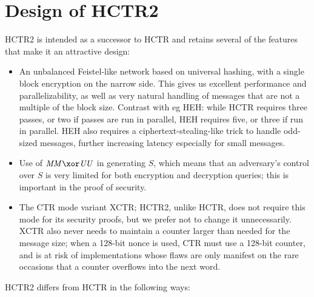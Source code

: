 \documentclass[hctr.tex]{subfiles}
\begin{document}
\section{Design of HCTR2}\label{design}
HCTR2 is intended as a successor to HCTR and retains several of the
features that make it an attractive design:
\begin{itemize}
    \item An unbalanced Feistel-like network based on universal
    hashing, with a single block encryption on the narrow side.
    This gives us excellent performance and parallelizability,
    as well as very natural handling of messages that are not
    a multiple of the block size. Contrast with eg HEH\cite{heh}:
    while HCTR requires three passes, or two if passes are
    run in parallel, HEH requires five, or three if run in parallel.
    HEH also requires a ciphertext-stealing-like trick to
    handle odd-sized messages, further increasing
    latency especially for small messages.
    \item Use of \(\MM \xor \UU\) in generating \(S\), which means
    that an adversary's control over \(S\) is very limited for both
    encryption and decryption queries; this is important in the
    proof of security.
    \item The CTR mode variant XCTR; HCTR2, unlike HCTR,
    does not require this mode for its security proofs, 
    but we prefer not to change it unnecessarily.
    XCTR also never needs to maintain a counter larger
    than needed for the message size;
    when a 128-bit nonce is used, CTR 
    must use a 128-bit counter, and is
    at risk of implementations
    whose flaws are only manifest on the
    rare occasions that a counter overflows
    into the next word.
\end{itemize}

HCTR2 differs from HCTR in the following ways:
\end{document}
